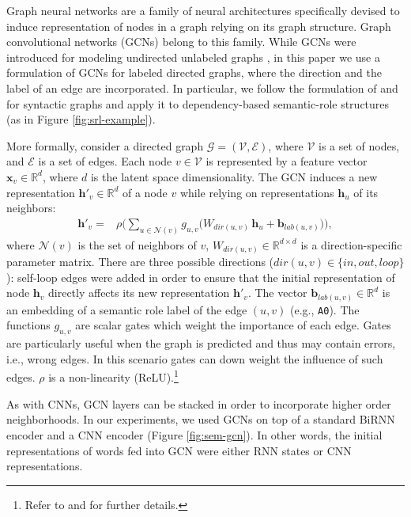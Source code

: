 \documentclass[11pt,a4paper]{article}
\begin{document}
Graph neural networks are a family of neural architectures \cite{scarselli2009graph,DBLP:conf/icml/GilmerSRVD17} specifically devised to induce representation of nodes in a graph relying on its graph structure.
Graph convolutional networks (GCNs) belong to this family.
While GCNs were introduced for modeling undirected unlabeled graphs \cite{kipf2016semigraphconv}, in this paper we use a formulation of GCNs for labeled directed graphs, where the direction and the label of an edge are incorporated.
In particular, we follow the formulation of  and  for syntactic graphs and apply it to dependency-based semantic-role structures \cite{DBLP:conf/conll/HajicCJKMMMNPSSSXZ09} (as in  Figure \ref{fig:srl-example}).

More formally, consider a directed graph $\mathcal{G} = (\mathcal{V}, \mathcal{E})$, where $\mathcal{V}$ is a set of nodes, and $\mathcal{E}$ is a set of edges. 
Each node $v \in \mathcal{V}$ is represented by a feature vector $\mathbf{x}_v \in \mathbb{R}^d$, where $d$ is the latent space dimensionality.
The GCN induces a new representation $\mathbf{h}'_v \in \mathbb{R}^d$ of a node $v$ while relying on representations $\mathbf{h}_u$ of its neighbors:
\begin{align*}
\mathbf{h}'_v\!\!=&\rho\Big(\!\!\!\sum_{u \in \mathcal{N}(v)} \!\!\! g_{u, v} \big(W_{dir(u, v)} \, \mathbf{h}_u + \mathbf{b}_{lab(u, v)}\big)\Big),
\end{align*}
where $\mathcal{N}(v)$ is the set of neighbors of $v$, $W_{dir(u, v)} \in \mathbb{R}^{d \times d}$ is a direction-specific parameter matrix. 
There are three possible directions ($dir(u, v) \in \{in, out, loop\}$): self-loop edges were added in order to ensure that the initial representation of node $\mathbf{h}_v$ directly affects its new representation $\mathbf{h}'_v$. 
The vector $\mathbf{b}_{lab(u, v)} \in \mathbb{R}^d$ is an embedding of a semantic role label of the edge $(u,v)$ (e.g., {\tt A0}). 
The functions $g_{u, v}$ are scalar gates which weight the importance of each edge.
Gates are particularly useful when the graph is predicted and thus may contain errors, i.e., wrong edges.
In this scenario gates can down weight the influence of such edges. 
$\rho$ is a non-linearity (ReLU).\footnote{Refer to  and  for further details.}

As with CNNs, GCN layers can be stacked in order to incorporate higher order neighborhoods. 
In our experiments, we used GCNs on top of a standard BiRNN encoder and a CNN encoder (Figure \ref{fig:sem-gcn}). 
In other words, the initial representations of words fed into GCN were either RNN states or CNN representations.
\end{document}
